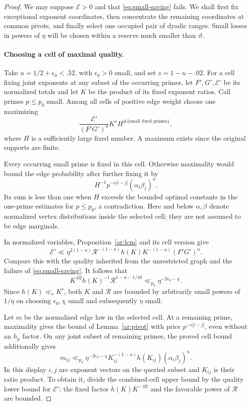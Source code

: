 \begin{proof}
We may suppose $\mathcal E>0$ and that \eqref{eq:small-saving} fails.
We shall first fix exceptional exponent coordinates, then concentrate
the remaining coordinates at common pivots, and finally select one
occupied pair of dyadic ranges. Small losses in powers of $\eta$ will
be chosen within a reserve much smaller than $\vartheta$.

\paragraph{Choosing a cell of maximal quality.}
Take $u=1/2+\epsilon_0<.52$, with $\epsilon_0>0$ small, and set
$s=1-u-.02$. For a cell fixing joint exponents at any subset of the
occurring primes, let $F',G',\mathcal E'$ be its normalized totals and
let $K$ be the product of its fixed exponent ratios. Call primes
$p\le p_0$ small. Among all cells of positive edge weight choose one
maximizing
\[
 \frac{\mathcal E'}{(F'G')^u}
 K^s H^{\#\{\text{small fixed primes}\}},
\]
where $H$ is a sufficiently large fixed number. A maximum exists since
the original supports are finite.

Every occurring small prime is fixed in this cell. Otherwise maximality
would bound the edge probability after further fixing it by
\[
 H^{-1}p^{-s|i-j|}(\alpha_i\beta_j)^u.
\]
Its sum is less than one when $H$ exceeds the bounded optimal constants
in the one-prime estimates
for $p\le p_0$, a contradiction. Here and below $\alpha,\beta$ denote
normalized vertex distributions inside the selected cell; they are not
assumed to be edge marginals.

In normalized variables, Proposition~\ref{ar:lcm} and its cell version
give
\[
 \mathcal E'\ll
 \eta^{2(1-u)}\mathcal R^{-(1-u)}
 h(K)K^{-(1-u)}(F'G')^u.
\]
Compare this with the quality inherited from the unrestricted graph and
the failure of \eqref{eq:small-saving}. It follows that
\begin{equation}\label{ar:fixed-ratio}
 K^{.02}h(K)^{-1}\mathcal R^{1-u-1/10}
 \ll_{p_0}\eta^{-2\epsilon_0-\chi}.
\end{equation}
Since $h(K)\ll_\epsilon K^\epsilon$, both $K$ and $\mathcal R$ are
bounded by arbitrarily small powers of $1/\eta$ on choosing
$\epsilon_0,\chi$ small and subsequently $\eta$ small.

Let $m$ be the normalized edge law in the selected cell. At a remaining
prime, maximality gives the bound of Lemma~\ref{ar:pivot} with price
$p^{-s|i-j|}$, even without an $h_p$ factor. On any joint subset of
remaining primes, the proved cell bound additionally gives
\begin{equation}\label{eq:joint-cell}
 m_{ij}\ll_{p_0}\eta^{-2\epsilon_0-\chi}
 K_{ij}^{-(1-u)}h(K_{ij})(\alpha_i\beta_j)^u.
\end{equation}
In this display $i,j$ are exponent vectors on the queried subset and
$K_{ij}$ is their ratio product. To obtain it, divide the combined-cell
upper bound by the quality lower bound for $\mathcal E'$; the fixed
factor $h(K)K^{-.02}$ and the favorable power of $\mathcal R$ are
bounded.


\end{proof}
